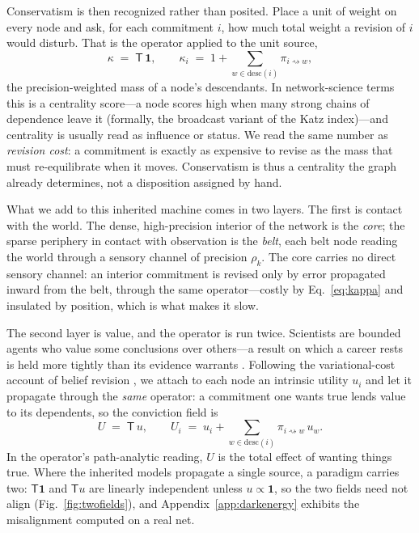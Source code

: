 \documentclass[11pt]{article}
\newcommand{\desc}{\mathrm{desc}}
\newcommand{\rw}{\rightsquigarrow}
\newcommand{\Top}{\mathsf{T}}          %
\newcommand{\bone}{\mathbf{1}}         %
\begin{document}
Conservatism is then recognized rather than posited. Place a unit of weight on every node and ask,
for each commitment $i$, how much total weight a revision of $i$ would disturb. That is the operator
applied to the unit source,
\begin{equation}
\kappa \;=\; \Top\,\bone,
\qquad
\kappa_i \;=\;1+\!\!\sum_{w\in\desc(i)}\!\!\pi_{i\rw w},
\label{eq:kappa}
\end{equation}
the precision-weighted mass of a node's descendants. In network-science terms this is a centrality
score---a node scores high when many strong chains of dependence leave it (formally, the broadcast
variant of the Katz index)---and centrality is usually read as influence or status. We read the same
number as \emph{revision cost}: a commitment is exactly as expensive to revise as the mass that must
re-equilibrate when it moves. Conservatism is thus a centrality the graph already determines, not a
disposition assigned by hand.

What we add to this inherited machine comes in two layers. The first is contact with the world. The
dense, high-precision interior of the network is the \emph{core}; the sparse periphery in contact
with observation is the \emph{belt}, each belt node reading the world through a sensory channel of
precision $\rho_k$. The core carries no direct sensory channel: an interior commitment is revised
only by error propagated inward from the belt, through the same operator---costly by
Eq.~\eqref{eq:kappa} and insulated by position, which is what makes it slow.

The second layer is value, and the operator is run twice. Scientists are bounded agents who value
some conclusions over others---a result on which a career rests is held more tightly than its
evidence warrants \citep{kitcher1990,strevens2003}. Following the variational-cost account of belief
revision \citep{hyland2025}, we attach to each node an intrinsic utility $u_i$ and let it propagate
through the \emph{same} operator: a commitment one wants true lends value to its dependents, so the
conviction field is
\begin{equation}
U \;=\; \Top\,u,
\qquad
U_i \;=\; u_i+\!\!\sum_{w\in\desc(i)}\!\!\pi_{i\rw w}\,u_w .
\label{eq:U}
\end{equation}
In the operator's path-analytic reading, $U$ is the total effect of wanting things true. Where the
inherited models propagate a single source, a paradigm carries two: $\Top\bone$ and $\Top u$ are
linearly independent unless $u\propto\bone$, so the two fields need not align
(Fig.~\ref{fig:twofields}), and Appendix~\ref{app:darkenergy} exhibits the misalignment computed on
a real net.
\end{document}
